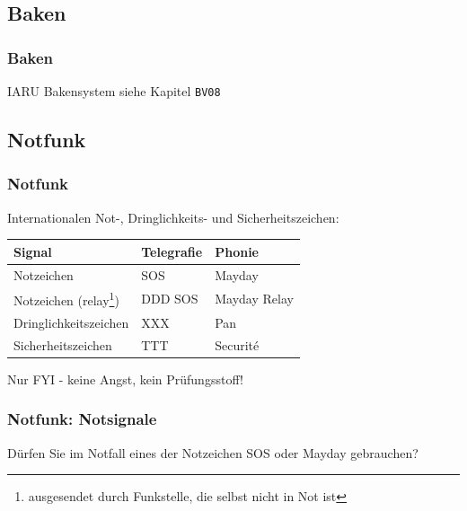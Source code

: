 \subsection{Baken}

\begin{frame}
    \frametitle{Baken}

    IARU Bakensystem siehe Kapitel \texttt{BV08}

\end{frame}

\subsection{Notfunk}


\begin{frame}
    \frametitle{Notfunk}

    Internationalen Not-, Dringlichkeits- und Sicherheitszeichen:

    \begin{center}
    \begin{tabular}{|l|l|l|}\hline
        \textbf{Signal}       & \textbf{Telegrafie} & \textbf{Phonie} \\ \hline \hline
        Notzeichen            & SOS                 & Mayday          \\ \hline
        Notzeichen (relay\footnote{ausgesendet durch Funkstelle, die selbst nicht in Not ist})
                              & DDD SOS & Mayday Relay \\ \hline
        Dringlichkeitszeichen & XXX                 & Pan              \\ \hline
        Sicherheitszeichen    & TTT                 & Securité         \\ \hline
    \end{tabular}
    \end{center}

    Nur FYI - keine Angst, kein Prüfungsstoff!

\end{frame}

\begin{frame}
    \frametitle{Notfunk: Notsignale}

    \begin{exampleblock}{Dürfen Sie im Notfall eines der Notzeichen SOS oder Mayday gebrauchen?}
    \end{exampleblock}


\end{frame}

